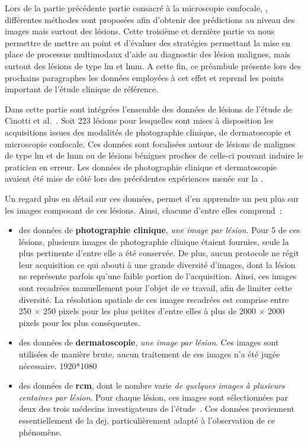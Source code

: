 \renewcommand{\thechapter}{\roman{chapter}}
\setcounter{chapter}{4}
\setcounter{figure}{0}

\label{chap:preamble_multimodal}
Lors de la partie précédente partie consacré à la microscopie confocale, , différentes méthodes sont proposées afin d'obtenir des prédictions au niveau des images mais surtout des lésions. Cette troisième et dernière partie va nous permettre de mettre au point et d'évaluer des stratégies permettant la mise en place de processus multimodaux d'aide au diagnostic des lésion malignes, mais surtout des lésions de type \gls{lm} et \gls{lmm}. A cette fin, ce préambule présente lors des prochains paragraphes les données employées à cet effet et reprend les points important de l'étude clinique de référence.\par

Dans cette partie sont intégrées l'ensemble des données de lésions de l'étude de Cinotti et al.~\cite{Cinotti2018}. Soit 223 lésions pour lesquelles sont mises à disposition les acquisitions issues des modalités de photographie clinique, de dermatoscopie et microscopie confocale. Ces données sont focalisées autour de lésions de malignes de type \gls{lm} et de \gls{lmm} ou de lésions bénignes proches de celle-ci pouvant induire le praticien en erreur. Les données de photographie clinique et dermatoscopie avaient été mise de côté lors des précédentes expériences menée sur la .\par

Un regard plus en détail sur ces données, permet d'en apprendre un peu plus sur les images composant de ces lésions. Ainsi, chacune d'entre elles comprend~:
\begin{itemize}
    \item des données de \textbf{photographie clinique}, \textit{une image par lésion}. Pour 5 de ces lésions, plusieurs images de photographie clinique étaient fournies, seule la plus pertinente d'entre elle a été conservée. De plus, aucun protocole ne régit leur acquisition ce qui abouti à une grande diversité d'images, dont la lésion ne représente parfois qu'une faible portion de l'acquisition. Ainsi, ces images sont recadrées manuellement pour l'objet de ce travail, afin de limiter cette diversité. La résolution spatiale de ces images recadrées est comprise entre 250 $\times$ 250 pixels pour les plus petites d'entre elles à plus de 2000 $\times$ 2000 pixels pour les plus conséquentes.
    \item des données de \textbf{dermatoscopie}, \textit{une image par lésion}. Ces images sont utilisées de manière brute, aucun traitement de ces images n'a été jugée nécessaire. 1920*1080
    \item des données de \textbf{\gls{rcm}}, dont le nombre varie \textit{de quelques images à plusieurs centaines par lésion}. Pour chaque lésion, ces images sont sélectionnées par deux des trois médecins investigateurs de l'étude~\cite{Cinotti2018}. Ces données proviennent essentiellement de la \gls{dej}, particulièrement adapté à l'observation de ce phénomène.
\end{itemize}


